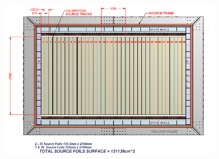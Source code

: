 \documentclass[main.tex]{subfiles}
\begin{document}
\begin{figure}[h!]
\begin{center}
\includegraphics[scale=0.33]{pictures/Chap3/foil.png}

\end{center}
\end{figure}
\end{document}
